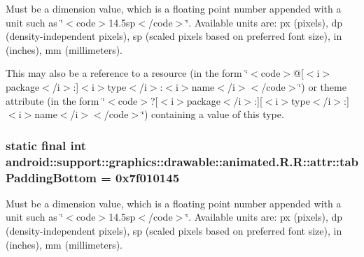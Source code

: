 Must be a dimension value, which is a floating point number appended with a unit such as \char`\"{}$<$code$>$14.5sp$<$/code$>$\char`\"{}. Available units are: px (pixels), dp (density-independent pixels), sp (scaled pixels based on preferred font size), in (inches), mm (millimeters). 

This may also be a reference to a resource (in the form \char`\"{}$<$code$>$@\mbox{[}$<$i$>$package$<$/i$>$:\mbox{]}$<$i$>$type$<$/i$>$:$<$i$>$name$<$/i$>$$<$/code$>$\char`\"{}) or theme attribute (in the form \char`\"{}$<$code$>$?\mbox{[}$<$i$>$package$<$/i$>$:\mbox{]}\mbox{[}$<$i$>$type$<$/i$>$:\mbox{]}$<$i$>$name$<$/i$>$$<$/code$>$\char`\"{}) containing a value of this type. \hypertarget{classandroid_1_1support_1_1graphics_1_1drawable_1_1animated_1_1_r_1_1attr_8d406ba506b18750653c5eac1109b6cd}{
\subsubsection[{tabPaddingBottom}]{\setlength{\rightskip}{0pt plus 5cm}static final int android::support::graphics::drawable::animated.R.R::attr::tabPaddingBottom = 0x7f010145}}
\label{classandroid_1_1support_1_1graphics_1_1drawable_1_1animated_1_1_r_1_1attr_8d406ba506b18750653c5eac1109b6cd}


Must be a dimension value, which is a floating point number appended with a unit such as \char`\"{}$<$code$>$14.5sp$<$/code$>$\char`\"{}. Available units are: px (pixels), dp (density-independent pixels), sp (scaled pixels based on preferred font size), in (inches), mm (millimeters). 

